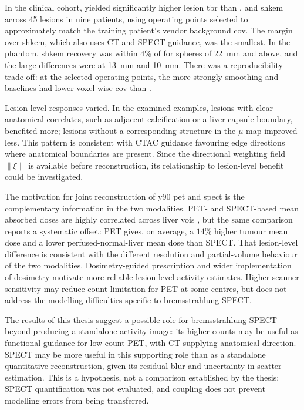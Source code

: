 In the clinical cohort, \wdtnv{} yielded significantly higher lesion \gls{tbr} than \dtv, \wtnv{} and \gls{shkem} across 45 lesions in nine patients, using operating points selected to approximately match the training patient's vendor background \gls{cov}. The margin over \gls{shkem}, which also uses CT and SPECT guidance, was the smallest. In the phantom, \gls{shkem} recovery was within 4\% of \wdtnv{} for spheres of \SI{22}{\milli\metre} and above, and the large differences were at \SI{13}{\milli\metre} and \SI{10}{\milli\metre}. There was a reproducibility trade-off: at the selected operating points, the more strongly smoothing \dtv{} and \wtnv{} baselines had lower voxel-wise \gls{cov} than \wdtnv{}.

Lesion-level responses varied. In the examined examples, lesions with clear anatomical correlates, such as adjacent calcification or a liver capsule boundary, benefited more; lesions without a corresponding structure in the $\mu$-map improved less. This pattern is consistent with CTAC guidance favouring edge directions where anatomical boundaries are present. Since the directional weighting field $\|\xi\|$ is available before reconstruction, its relationship to lesion-level benefit could be investigated.

The motivation for joint reconstruction of \gls{y90} \gls{pet} and \gls{spect} is the complementary information in the two modalities. PET- and SPECT-based mean absorbed doses are highly correlated across liver \glspl{voi} \cite{kappadathQuantitativeEvaluation90YPET2024}, but the same comparison reports a systematic offset: PET gives, on average, a $14\%$ higher tumour mean dose and a lower perfused-normal-liver mean dose than SPECT. That lesion-level difference is consistent with the different resolution and partial-volume behaviour of the two modalities. Dosimetry-guided prescription \cite{salemClinicalDosimetricConsiderations2019} and wider implementation of dosimetry \cite{gearEANMEnablingGuide2023} motivate more reliable lesion-level activity estimates. Higher scanner sensitivity may reduce count limitation for PET at some centres, but does not address the modelling difficulties specific to bremsstrahlung SPECT.

The results of this thesis suggest a possible role for bremsstrahlung SPECT beyond producing a standalone activity image: its higher counts may be useful as functional guidance for low-count PET, with CT supplying anatomical direction. SPECT may be more useful in this supporting role than as a standalone quantitative reconstruction, given its residual blur and uncertainty in scatter estimation. This is a hypothesis, not a comparison established by the thesis; SPECT quantification was not evaluated, and coupling does not prevent modelling errors from being transferred.

